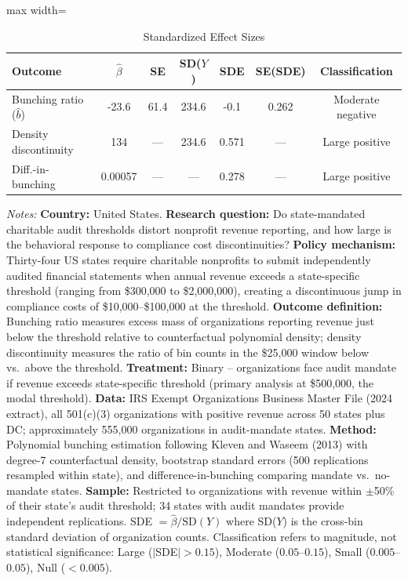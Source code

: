 \begin{table}[t]
\centering
\caption{Standardized Effect Sizes}
\label{tab:sde}
\begin{adjustbox}{max width=\textwidth}
\begin{tabular}{lcccccc}
\hline\hline
Outcome & $\hat{\beta}$ & SE & SD($Y$) & SDE & SE(SDE) & Classification \\
\hline
Bunching ratio ($\hat{b}$) & -23.6 & 61.4 & 234.6 & -0.1 & 0.262 & Moderate negative \\
Density discontinuity & 134 & --- & 234.6 & 0.571 & --- & Large positive \\
Diff.-in-bunching & 0.00057 & --- & --- & 0.278 & --- & Large positive \\
\hline\hline
\end{tabular}
\end{adjustbox}
\begin{tablenotes}[flushleft]
\small
\item \textit{Notes:} \textbf{Country:} United States. \textbf{Research question:} Do state-mandated charitable audit thresholds distort nonprofit revenue reporting, and how large is the behavioral response to compliance cost discontinuities? \textbf{Policy mechanism:} Thirty-four US states require charitable nonprofits to submit independently audited financial statements when annual revenue exceeds a state-specific threshold (ranging from \$300,000 to \$2,000,000), creating a discontinuous jump in compliance costs of \$10,000--\$100,000 at the threshold. \textbf{Outcome definition:} Bunching ratio measures excess mass of organizations reporting revenue just below the threshold relative to counterfactual polynomial density; density discontinuity measures the ratio of bin counts in the \$25,000 window below vs.\ above the threshold. \textbf{Treatment:} Binary -- organizations face audit mandate if revenue exceeds state-specific threshold (primary analysis at \$500,000, the modal threshold). \textbf{Data:} IRS Exempt Organizations Business Master File (2024 extract), all 501(c)(3) organizations with positive revenue across 50 states plus DC; approximately 555,000 organizations in audit-mandate states. \textbf{Method:} Polynomial bunching estimation following Kleven and Waseem (2013) with degree-7 counterfactual density, bootstrap standard errors (500 replications resampled within state), and difference-in-bunching comparing mandate vs.\ no-mandate states. \textbf{Sample:} Restricted to organizations with revenue within $\pm$50\% of their state's audit threshold; 34 states with audit mandates provide independent replications. SDE $= \hat{\beta} / \text{SD}(Y)$ where SD($Y$) is the cross-bin standard deviation of organization counts. Classification refers to magnitude, not statistical significance: Large ($|$SDE$| > 0.15$), Moderate ($0.05$--$0.15$), Small ($0.005$--$0.05$), Null ($< 0.005$).
\end{tablenotes}
\end{table}
